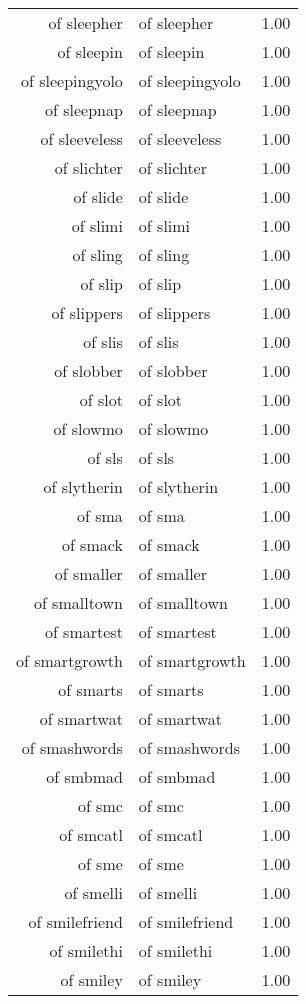\begin{table}[ht]
\begin{tabular}{rlr}
  of sleepher & of sleepher & 1.00 \\ 
  of sleepin & of sleepin & 1.00 \\ 
  of sleepingyolo & of sleepingyolo & 1.00 \\ 
  of sleepnap & of sleepnap & 1.00 \\ 
  of sleeveless & of sleeveless & 1.00 \\ 
  of slichter & of slichter & 1.00 \\ 
  of slide & of slide & 1.00 \\ 
  of slimi & of slimi & 1.00 \\ 
  of sling & of sling & 1.00 \\ 
  of slip & of slip & 1.00 \\ 
  of slippers & of slippers & 1.00 \\ 
  of slis & of slis & 1.00 \\ 
  of slobber & of slobber & 1.00 \\ 
  of slot & of slot & 1.00 \\ 
  of slowmo & of slowmo & 1.00 \\ 
  of sls & of sls & 1.00 \\ 
  of slytherin & of slytherin & 1.00 \\ 
  of sma & of sma & 1.00 \\ 
  of smack & of smack & 1.00 \\ 
  of smaller & of smaller & 1.00 \\ 
  of smalltown & of smalltown & 1.00 \\ 
  of smartest & of smartest & 1.00 \\ 
  of smartgrowth & of smartgrowth & 1.00 \\ 
  of smarts & of smarts & 1.00 \\ 
  of smartwat & of smartwat & 1.00 \\ 
  of smashwords & of smashwords & 1.00 \\ 
  of smbmad & of smbmad & 1.00 \\ 
  of smc & of smc & 1.00 \\ 
  of smcatl & of smcatl & 1.00 \\ 
  of sme & of sme & 1.00 \\ 
  of smelli & of smelli & 1.00 \\ 
  of smilefriend & of smilefriend & 1.00 \\ 
  of smilethi & of smilethi & 1.00 \\ 
  of smiley & of smiley & 1.00 \\ 

\end{tabular}
\end{table}
